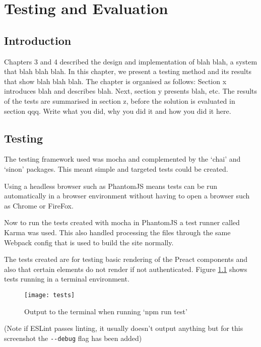 \chapter{Testing and Evaluation} \label{t-e}

\section{Introduction} \label{t-e--introduction}

Chapters 3 and 4 described the design and implementation of blah blah, a system that blah blah blah.  In this chapter, we present a testing method and its results that show blah blah blah.  The chapter is organised as follows:  Section x introduces blah and describes blah.  Next, section y presents blah, etc.
The results of the tests are summarised in section z, before the solution is evaluated in section qqq.
Write what you did, why you did it and how you did it here.

\section{Testing} \label{t-e--testing}

The testing framework used was mocha and complemented by the `chai' and `sinon' packages. This meant simple and targeted tests could be created. \cite{mocha}

Using a headless browser such as PhantomJS means tests can be run automatically in a browser environment without having to open a browser such as Chrome or FireFox. \cite{phantomjs}

Now to run the tests created with mocha in PhantomJS a test runner called Karma was used. \cite{karma} This also handled processing the files through the same Webpack config that is used to build the site normally.

The tests created are for testing basic rendering of the Preact components and also that certain elements do not render if not authenticated. Figure \ref{figure-tests} shows tests running in a terminal environment.

\begin{figure}[H]
  \centering
    \texttt{[image: tests]}
  \caption{Output to the terminal when running `npm run test'}
  \label{figure-tests}
\end{figure}

(Note if ESLint passes linting, it usually doesn't output anything but for this screenshot the \verb|--debug| flag has been added)


